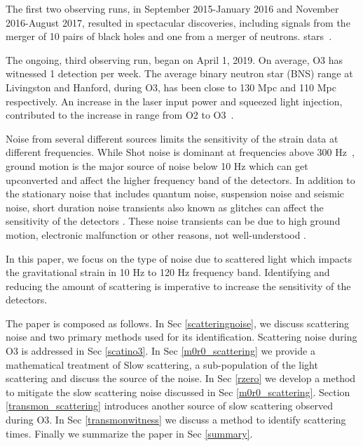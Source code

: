 \documentclass[12pt]{iopart}
\begin{document}
The first two observing runs, in September 2015-January 2016 and November 2016-August 2017, resulted in spectacular discoveries, including signals from the merger of 10 pairs of black holes and one from a merger of neutrons. stars~\cite{catalogue,firstpaper,neturonpaper}.

The ongoing, third observing run, began on April 1, 2019. On average, O3 has witnessed 1 detection per week. The average binary neutron star (BNS) range at Livingston and Hanford, during O3, has been close to 130 Mpc and 110 Mpc respectively. An increase in the laser input power and squeezed light injection, contributed to the increase in range from O2 to O3~\cite{src,prospect}.


Noise from several different sources limits the sensitivity of the strain data at different frequencies. 
While Shot noise is dominant at frequencies above 300 Hz~\cite{tjthesis}, ground motion is the major source of noise below 10 Hz which can get upconverted and affect the higher frequency band of the detectors. In addition to the stationary noise that includes quantum noise, suspension noise and seismic noise, short duration noise transients also known as glitches can affect the sensitivity of the detectors \cite{transientpaper}. These noise transients can be due to high ground motion, electronic malfunction or other reasons, not well-understood \cite{noisepaper,Cabero_2019}.

In this paper, we focus on the type of noise due to scattered light which impacts the gravitational strain in 10 Hz to 120 Hz frequency band.  Identifying and reducing the amount of scattering is imperative to increase the sensitivity of the detectors. 
 
The paper is composed as follows. In Sec \ref{scatteringnoise}, we discuss scattering noise and two primary methods used for its identification. Scattering noise during O3 is addressed in Sec   \ref{scatino3}. In Sec \ref{m0r0_scattering} we provide a mathematical treatment of Slow scattering, a sub-population of the light scattering and discuss the source of the noise. In Sec \ref{rzero} we develop a method to mitigate the slow scattering noise discussed in Sec \ref{m0r0_scattering}. Section \ref{transmon_scattering} introduces another source of slow scattering observed during O3. In Sec \ref{transmonwitness} we discuss a method to identify scattering times. Finally we summarize the paper in Sec \ref{summary}. 


 
 
\end{document}
